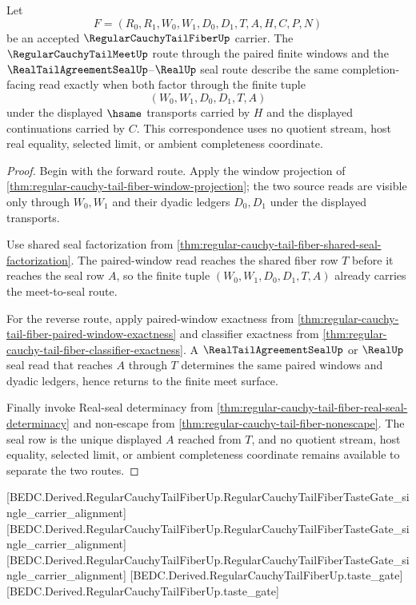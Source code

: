 \begin{theorem}
\label{thm:regular-cauchy-tail-fiber-finite-window-real-seal-equivalence}
Let
$$
F=(R_0,R_1,W_0,W_1,D_0,D_1,T,A,H,C,P,N)
$$
be an accepted $\RegularCauchyTailFiberUp$ carrier. The $\RegularCauchyTailMeetUp$ route through the paired finite windows and the $\RealTailAgreementSealUp$--$\RealUp$ seal route describe the same completion-facing read exactly when both factor through the finite tuple
$$
(W_0,W_1,D_0,D_1,T,A)
$$
under the displayed $\hsame$ transports carried by $H$ and the displayed continuations carried by $C$. This correspondence uses no quotient stream, host real equality, selected limit, or ambient completeness coordinate.
\end{theorem}
\begin{proof}
Begin with the forward route. Apply the window projection of \autoref{thm:regular-cauchy-tail-fiber-window-projection}; the two source reads are visible only through $W_0,W_1$ and their dyadic ledgers $D_0,D_1$ under the displayed transports.

Use shared seal factorization from \autoref{thm:regular-cauchy-tail-fiber-shared-seal-factorization}. The paired-window read reaches the shared fiber row $T$ before it reaches the seal row $A$, so the finite tuple $(W_0,W_1,D_0,D_1,T,A)$ already carries the meet-to-seal route.

For the reverse route, apply paired-window exactness from \autoref{thm:regular-cauchy-tail-fiber-paired-window-exactness} and classifier exactness from \autoref{thm:regular-cauchy-tail-fiber-classifier-exactness}. A $\RealTailAgreementSealUp$ or $\RealUp$ seal read that reaches $A$ through $T$ determines the same paired windows and dyadic ledgers, hence returns to the finite meet surface.

Finally invoke Real-seal determinacy from \autoref{thm:regular-cauchy-tail-fiber-real-seal-determinacy} and non-escape from \autoref{thm:regular-cauchy-tail-fiber-nonescape}. The seal row is the unique displayed $A$ reached from $T$, and no quotient stream, host equality, selected limit, or ambient completeness coordinate remains available to separate the two routes.
\end{proof}

[BEDC.Derived.RegularCauchyTailFiberUp.RegularCauchyTailFiberTasteGate\_single\_carrier\_alignment]
[BEDC.Derived.RegularCauchyTailFiberUp.RegularCauchyTailFiberTasteGate\_single\_carrier\_alignment]
[BEDC.Derived.RegularCauchyTailFiberUp.RegularCauchyTailFiberTasteGate\_single\_carrier\_alignment]
[BEDC.Derived.RegularCauchyTailFiberUp.taste\_gate]
[BEDC.Derived.RegularCauchyTailFiberUp.taste\_gate]


